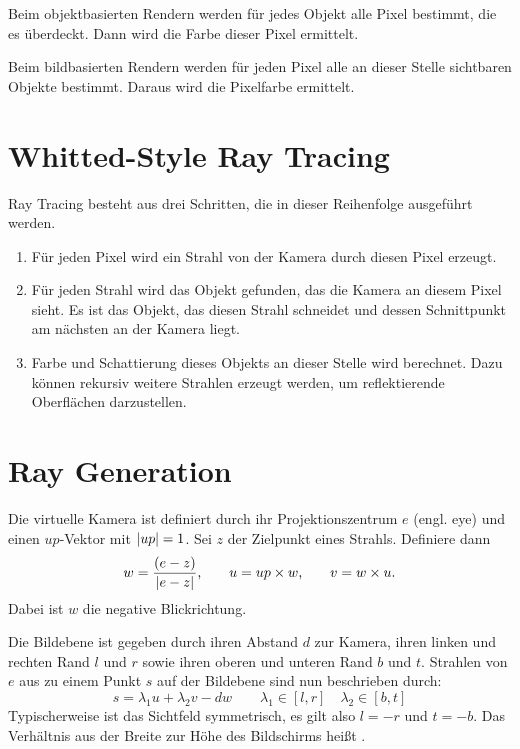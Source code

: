 Beim objektbasierten Rendern werden für jedes Objekt alle Pixel bestimmt, die es überdeckt.
Dann wird die Farbe dieser Pixel ermittelt.

Beim bildbasierten Rendern werden für jeden Pixel alle an dieser Stelle sichtbaren Objekte bestimmt.
Daraus wird die Pixelfarbe ermittelt.

\section{Whitted-Style Ray Tracing}
Ray Tracing besteht aus drei Schritten, die in dieser Reihenfolge ausgeführt werden.
\begin{enumerate}
	\item {} Für jeden Pixel wird ein Strahl von der Kamera durch diesen Pixel erzeugt.
	\item {} Für jeden Strahl wird das Objekt gefunden, das die Kamera an diesem Pixel sieht.
	Es ist das Objekt, das diesen Strahl schneidet und dessen Schnittpunkt am nächsten an der Kamera liegt.
	\item {} Farbe und Schattierung dieses Objekts an dieser Stelle wird berechnet.
	Dazu können rekursiv weitere Strahlen erzeugt werden, um \zB reflektierende Oberflächen darzustellen.
\end{enumerate}

\section{Ray Generation}
Die virtuelle Kamera ist definiert durch ihr Projektionszentrum $e$ (engl. eye) und einen $up$-Vektor mit $\vert up \vert = 1$.
Sei $z$ der Zielpunkt eines Strahls.
Definiere dann
\[
	w = \frac{(e - z)}{\vert e - z \vert} \text{,} \qquad
	u = up \times w \text {,} \qquad
	v = w \times u \text{.}
\]
Dabei ist $w$ die negative Blickrichtung.

Die Bildebene ist gegeben durch ihren Abstand $d$ zur Kamera, ihren linken und rechten Rand $l$ und $r$ sowie ihren oberen und unteren Rand $b$ und $t$.
Strahlen von $e$ aus zu einem Punkt $s$ auf der Bildebene sind nun beschrieben durch:
\[
	s = \lambda_1 u + \lambda_2 v - dw \qquad \lambda_1 \in [l, r] \quad \lambda_2 \in [b, t] 
\]
Typischerweise ist das Sichtfeld symmetrisch, es gilt also $l = -r$ und $t = -b$.
Das Verhältnis aus der Breite zur Höhe des Bildschirms heißt .


